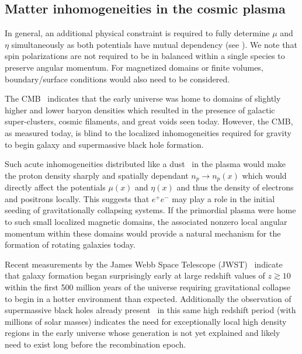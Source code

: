 \subsection{Matter inhomogeneities in the cosmic plasma}
\label{sec:inhomogeneous}
\noindent In general, an additional physical constraint is required to fully determine $\mu$ and $\eta$ simultaneously as both potentials have mutual dependency (see ). We note that spin polarizations are not required to be in balanced within a single species to preserve angular momentum. For magnetized domains or finite volumes, boundary/surface conditions would also need to be considered.

The CMB~\citep{Planck:2018vyg} indicates that the early universe was home to domains of slightly higher and lower baryon densities which resulted in the presence of galactic super-clusters, cosmic filaments, and great voids seen today. However, the CMB, as measured today, is blind to the localized inhomogeneities required for gravity to begin galaxy and supermassive black hole formation.

Such acute inhomogeneities distributed like a dust~\citep{Grayson:2023flr} in the plasma would make the proton density sharply and spatially dependant $n_{p}\rightarrow n_{p}(x)$ which would directly affect the potentials $\mu(x)$ and $\eta(x)$ and thus the density of electrons and positrons locally. This suggests that $e^{+}e^{-}$ may play a role in the initial seeding of gravitationally collapsing systems. If the primordial plasma were home to such small localized magnetic domains, the associated nonzero local angular momentum within these domains would provide a natural mechanism for the formation of rotating galaxies today.

Recent measurements by the James Webb Space Telescope (JWST)~\citep{Yan:2022sxd,adams2023discovery,arrabal2023spectroscopic} indicate that galaxy formation began surprisingly early at large redshift values of $z\gtrsim10$ within the first 500 million years of the universe requiring gravitational collapse to begin in a hotter environment than expected. Additionally the observation of supermassive black holes already present~\citep{CEERSTeam:2023qgy} in this same high redshift period (with millions of solar masses) indicates the need for exceptionally local high density regions in the early universe whose generation is not yet explained and likely need to exist long before the recombination epoch.
